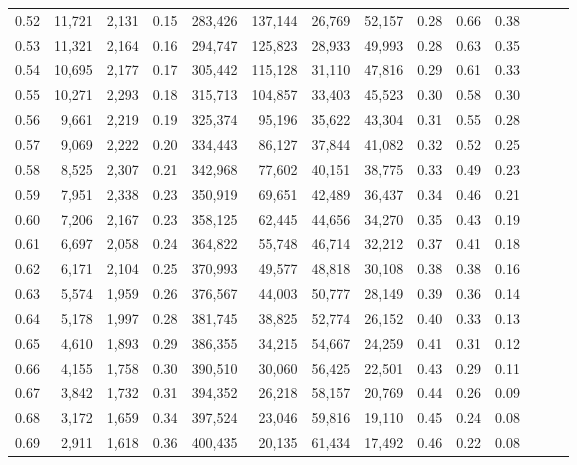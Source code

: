 \begin{tabular}{rrrrrrrrrrrrrr}
0.52 &  11,721 &  2,131 &  0.15 &  283,426 &  137,144 &  26,769 &  52,157 &  0.28 &  0.66 &      0.38 \\
0.53 &  11,321 &  2,164 &  0.16 &  294,747 &  125,823 &  28,933 &  49,993 &  0.28 &  0.63 &      0.35 \\
0.54 &  10,695 &  2,177 &  0.17 &  305,442 &  115,128 &  31,110 &  47,816 &  0.29 &  0.61 &      0.33 \\
0.55 &  10,271 &  2,293 &  0.18 &  315,713 &  104,857 &  33,403 &  45,523 &  0.30 &  0.58 &      0.30 \\
0.56 &   9,661 &  2,219 &  0.19 &  325,374 &   95,196 &  35,622 &  43,304 &  0.31 &  0.55 &      0.28 \\
0.57 &   9,069 &  2,222 &  0.20 &  334,443 &   86,127 &  37,844 &  41,082 &  0.32 &  0.52 &      0.25 \\
0.58 &   8,525 &  2,307 &  0.21 &  342,968 &   77,602 &  40,151 &  38,775 &  0.33 &  0.49 &      0.23 \\
0.59 &   7,951 &  2,338 &  0.23 &  350,919 &   69,651 &  42,489 &  36,437 &  0.34 &  0.46 &      0.21 \\
0.60 &   7,206 &  2,167 &  0.23 &  358,125 &   62,445 &  44,656 &  34,270 &  0.35 &  0.43 &      0.19 \\
0.61 &   6,697 &  2,058 &  0.24 &  364,822 &   55,748 &  46,714 &  32,212 &  0.37 &  0.41 &      0.18 \\
0.62 &   6,171 &  2,104 &  0.25 &  370,993 &   49,577 &  48,818 &  30,108 &  0.38 &  0.38 &      0.16 \\
0.63 &   5,574 &  1,959 &  0.26 &  376,567 &   44,003 &  50,777 &  28,149 &  0.39 &  0.36 &      0.14 \\
0.64 &   5,178 &  1,997 &  0.28 &  381,745 &   38,825 &  52,774 &  26,152 &  0.40 &  0.33 &      0.13 \\
0.65 &   4,610 &  1,893 &  0.29 &  386,355 &   34,215 &  54,667 &  24,259 &  0.41 &  0.31 &      0.12 \\
0.66 &   4,155 &  1,758 &  0.30 &  390,510 &   30,060 &  56,425 &  22,501 &  0.43 &  0.29 &      0.11 \\
0.67 &   3,842 &  1,732 &  0.31 &  394,352 &   26,218 &  58,157 &  20,769 &  0.44 &  0.26 &      0.09 \\
0.68 &   3,172 &  1,659 &  0.34 &  397,524 &   23,046 &  59,816 &  19,110 &  0.45 &  0.24 &      0.08 \\
0.69 &   2,911 &  1,618 &  0.36 &  400,435 &   20,135 &  61,434 &  17,492 &  0.46 &  0.22 &      0.08 \\

\end{tabular}

